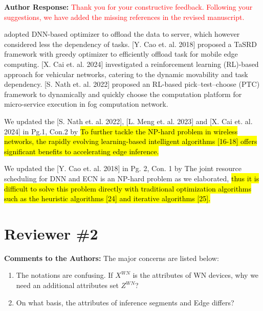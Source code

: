\documentclass{ar2rc}
\newcommand{\highlight}[1]{\sethlcolor{yellow!50}\hl{#1}}
\begin{document}
\textbf{Author Response:} 
\textcolor{red}{Thank you for your constructive feedback. Following your suggestions, we have added the missing references in the revised manuscript.}

\noindent [L. Meng et. al. 2023] adopted DNN-based optimizer to offload the data to server, which however considered less the dependency of tasks. [Y. Cao et. al. 2018] proposed a TaSRD framework with greedy optimizer to efficiently offload task for mobile edge computing. [X. Cai et. al. 2024] investigated a reinforcement learning (RL)-based approach for vehicular networks, catering to the dynamic movability and task dependency. [S. Nath et. al. 2022] proposed an RL-based pick–test–choose (PTC) framework to dynamically and quickly choose the computation platform for micro-service execution in fog computation network.

We updated the [S. Nath et. al. 2022], [L. Meng et. al. 2023] and [X. Cai et. al. 2024] in Pg.1, Con.2 by \highlight{To further tackle the NP-hard problem in wireless networks, the rapidly evolving learning-based intelligent algorithms [16-18] offers significant benefits to accelerating edge inference.}

We updated the [Y. Cao et. al. 2018] in Pg. 2, Con. 1 by The joint resource scheduling for DNN and ECN is an NP-hard problem as we elaborated, \highlight{thus it is difficult to solve this problem directly with traditional optimization algorithms such as the heuristic algorithms [24] and iterative algorithms [25].}



\section{Reviewer \#2}
\textbf{Comments to the Authors:} The major concerns are listed below:

\begin{tcolorbox}[
   title={Reviewer 2: Comment 1},
   colback=gray!10,%
   colframe=black,%
   width=\linewidth,%
   arc=1mm, auto outer arc,
   boxrule=0.5pt,
]
\begin{enumerate}
   \item The notations are confusing. If $X^{WN}$ is the attributes of WN devices, why we need an additional attributes set $Z^{WN}$? 
   \item On what basis, the attributes of inference segments and Edge differs?
 \end{enumerate}
\end{tcolorbox}
\end{document}
